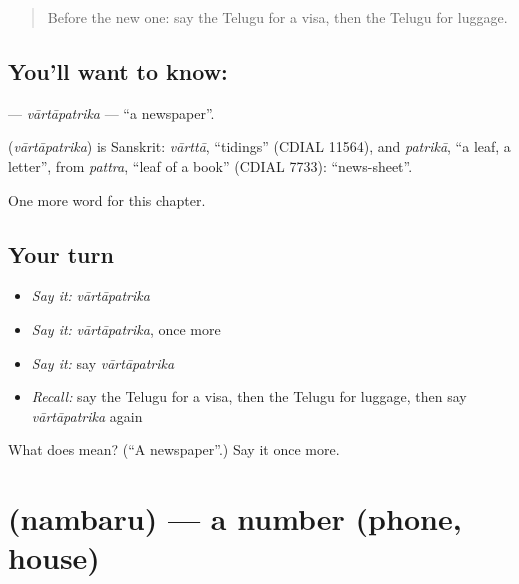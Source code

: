 \label{lesson:TE-C264-vartapatrika}



\begin{quote}
Before the new one: say the Telugu for a visa, then the Telugu for luggage.
\end{quote}

\subsection*{You'll want to know: }
\textbf{} — \emph{vārtāpatrika} — \textquotedblleft{}a newspaper\textquotedblright{}.

\begin{cousinweb}
\textbf{} (\emph{vārtāpatrika}) is Sanskrit: \emph{vārttā}, \textquotedblleft{}tidings\textquotedblright{} (CDIAL 11564), and \emph{patrikā}, \textquotedblleft{}a leaf, a letter\textquotedblright{}, from \emph{pattra}, \textquotedblleft{}leaf of a book\textquotedblright{} (CDIAL 7733): \textquotedblleft{}news-sheet\textquotedblright{}.
\end{cousinweb}

\begin{grammarlens}[title={What you've built}]
One more word for this chapter.
\end{grammarlens}

\subsection*{Your turn}
\begin{itemize}
\raggedright
  \item \emph{Say it:} \emph{vārtāpatrika}
  \item \emph{Say it:} \emph{vārtāpatrika}, once more
  \item \emph{Say it:} say \emph{vārtāpatrika}
  \item \emph{Recall:} say the Telugu for a visa, then the Telugu for luggage, then say \emph{vārtāpatrika} again
\end{itemize}

\begin{tcolorbox}[breakable,colback=teal!4,colframe=teal!35!black,title={Before you move on}]
What does  mean? (\textquotedblleft{}A newspaper\textquotedblright{}.) Say it once more.
\end{tcolorbox}
\section[\texorpdfstring{\te{నంబరు} (nambaru)}{నంబరు (nambaru)}]{ (nambaru) — a number (phone, house)}

